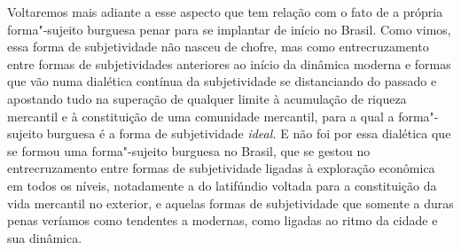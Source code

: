 Voltaremos mais adiante a esse aspecto que tem relação com o fato de a
própria forma"-sujeito burguesa penar para se implantar de início no
Brasil. Como vimos, essa forma de subjetividade não nasceu de chofre,
mas como entrecruzamento entre formas de subjetividades anteriores ao
início da dinâmica moderna e formas que vão numa dialética contínua da
subjetividade se distanciando do passado e apostando tudo na superação
de qualquer limite à acumulação de riqueza mercantil e à constituição de
uma comunidade mercantil, para a qual a forma"-sujeito burguesa é a forma
de subjetividade \emph{ideal.} E não foi por essa dialética que se
formou uma forma"-sujeito burguesa no Brasil, que se gestou no
entrecruzamento entre formas de subjetividade ligadas à exploração
econômica em todos os níveis, notadamente a do latifúndio voltada para a
constituição da vida mercantil no exterior, e aquelas formas de
subjetividade que somente a duras penas veríamos como tendentes a
modernas, como ligadas ao ritmo da cidade e sua dinâmica.

